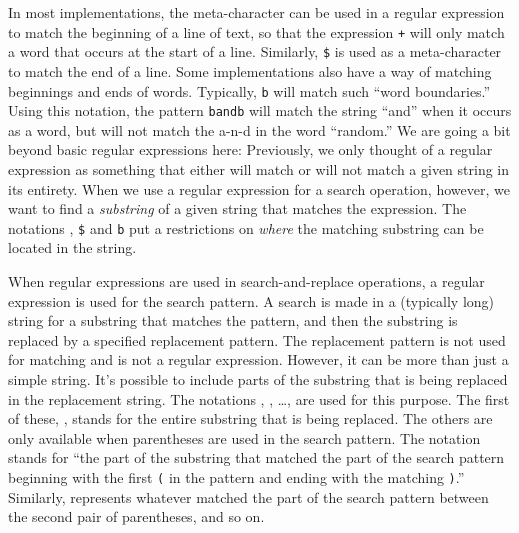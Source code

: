 In most implementations, the meta-character \texttt{\sol} can be used in
a regular expression to match the beginning of a line of text, so that
the expression \texttt{\sol [a-zA-Z]+} will only match a word that
occurs at the start of a line.  Similarly, \texttt{\$} is used
as a meta-character to match the end of a line.  Some implementations
also have a way of matching beginnings and ends of words.
Typically, \texttt{\bk b} will match such ``word boundaries.''
Using this notation, 
the pattern \texttt{\bk band\bk b} will match the string ``and''
when it occurs as a word, but will not match the \hbox{a-n-d}
in the word ``random.''  We are going a bit beyond
basic regular expressions here: Previously, we only thought of
a regular expression as something that either will match
or will not match a given string in its entirety.   When
we use a regular expression for a search operation, however,
we want to find a \textit{substring} of a given string that
matches the expression.  The notations \texttt{\sol},
\texttt{\$} and \texttt{\bk b} put a restrictions
on \textit{where} the matching substring can be located in the string.

\medskip

When regular expressions are used in search-and-replace operations,
a regular expression is used for the search pattern.  A search is
made in a (typically long) string for a substring that matches the pattern,
and then the substring is replaced by a specified replacement
pattern.  The replacement pattern is not used for matching
and is not a regular expression.  However, it can be more than
just a simple string.  It's possible to include parts of the
substring that is being replaced in the replacement string.
The notations \texttt{}, \texttt{}, \dots, \texttt{}
are used for this purpose.  The first of these, \texttt{},
stands for the entire substring that is being replaced.
The others are only available when parentheses are used in
the search pattern.  The notation \texttt{} stands for
``the part of the substring that matched the part of the
search pattern beginning with the first \texttt{(} in the
pattern and ending with the matching \texttt{)}.''  Similarly,
\texttt{} represents whatever matched the part of the
search pattern between the second pair of parentheses, and so on.

